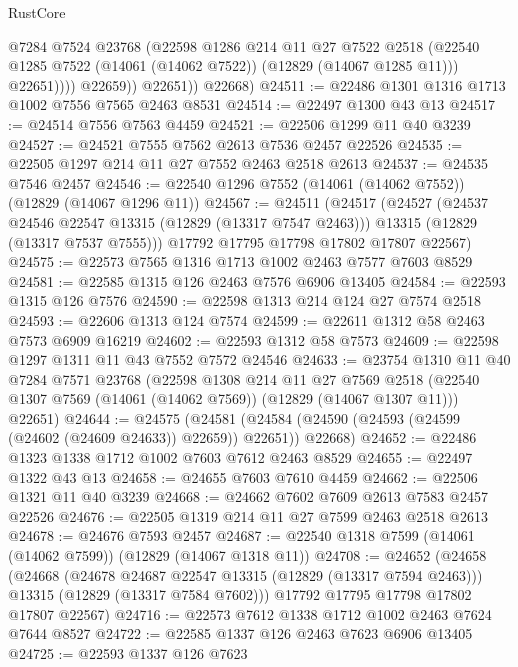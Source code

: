 \begin{lexlean}{RustCore}
\begin{coremodule}
                    @7284
                    @7524
                    @23768
                    (@22598
                      @1286
                      @214
                      @11
                      @27
                      @7522
                      @2518
                      (@22540 @1285 @7522 (@14061 (@14062 @7522)) (@12829 (@14067 @1285 @11)))
                      @22651))))
              @22659))
          @22651))
      @22668)
@24511 := @22486 @1301 @1316 @1713 @1002 @7556 @7565 @2463 @8531
@24514 := @22497 @1300 @43 @13
@24517 := @24514 @7556 @7563 @4459
@24521 := @22506 @1299 @11 @40 @3239
@24527 := @24521 @7555 @7562 @2613 @7536 @2457 @22526
@24535 := @22505 @1297 @214 @11 @27 @7552 @2463 @2518 @2613
@24537 := @24535 @7546 @2457
@24546 := @22540 @1296 @7552 (@14061 (@14062 @7552)) (@12829 (@14067 @1296 @11))
@24567 := @24511
    (@24517
      (@24527
        (@24537 @24546 @22547 @13315 (@12829 (@13317 @7547 @2463)))
        @13315
        (@12829 (@13317 @7537 @7555)))
      @17792
      @17795
      @17798
      @17802
      @17807
      @22567)
@24575 := @22573 @7565 @1316 @1713 @1002 @2463 @7577 @7603 @8529
@24581 := @22585 @1315 @126 @2463 @7576 @6906 @13405
@24584 := @22593 @1315 @126 @7576
@24590 := @22598 @1313 @214 @124 @27 @7574 @2518
@24593 := @22606 @1313 @124 @7574
@24599 := @22611 @1312 @58 @2463 @7573 @6909 @16219
@24602 := @22593 @1312 @58 @7573
@24609 := @22598 @1297 @1311 @11 @43 @7552 @7572 @24546
@24633 := @23754
    @1310
    @11
    @40
    @7284
    @7571
    @23768
    (@22598
      @1308
      @214
      @11
      @27
      @7569
      @2518
      (@22540 @1307 @7569 (@14061 (@14062 @7569)) (@12829 (@14067 @1307 @11)))
      @22651)
@24644 := @24575
    (@24581 (@24584 (@24590 (@24593 (@24599 (@24602 (@24609 @24633)) @22659)) @22651)) @22668)
@24652 := @22486 @1323 @1338 @1712 @1002 @7603 @7612 @2463 @8529
@24655 := @22497 @1322 @43 @13
@24658 := @24655 @7603 @7610 @4459
@24662 := @22506 @1321 @11 @40 @3239
@24668 := @24662 @7602 @7609 @2613 @7583 @2457 @22526
@24676 := @22505 @1319 @214 @11 @27 @7599 @2463 @2518 @2613
@24678 := @24676 @7593 @2457
@24687 := @22540 @1318 @7599 (@14061 (@14062 @7599)) (@12829 (@14067 @1318 @11))
@24708 := @24652
    (@24658
      (@24668
        (@24678 @24687 @22547 @13315 (@12829 (@13317 @7594 @2463)))
        @13315
        (@12829 (@13317 @7584 @7602)))
      @17792
      @17795
      @17798
      @17802
      @17807
      @22567)
@24716 := @22573 @7612 @1338 @1712 @1002 @2463 @7624 @7644 @8527
@24722 := @22585 @1337 @126 @2463 @7623 @6906 @13405
@24725 := @22593 @1337 @126 @7623

\end{coremodule}
\end{lexlean}
